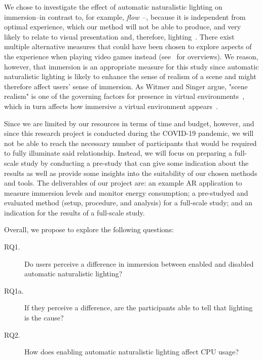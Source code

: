 \documentclass[12pt,twoside,english]{article}
\begin{document}
We chose to investigate the effect of automatic naturalistic lighting on immersion--in contrast to, for example, \textit{flow}~\cite{csikszentmihalyi_flow_1990}--, because it is independent from optimal experience, which our method will not be able to produce, and very likely to relate to visual presentation and, therefore, lighting~\cite{jennett_measuring_2008}.
There exist multiple alternative measures that could have been chosen to explore aspects of the experience when playing video games instead (see~\cite{dey_systematic_2018, dunser_survey_2008} for overviews).
We reason, however, that immersion is an appropriate measure for this study since automatic naturalistic lighting is likely to enhance the sense of realism of a scene and might therefore affect users' sense of immersion.
As Witmer and Singer argue, "scene realism" is one of the governing factors for presence in virtual environments~\cite{witmer_measuring_1998}, which in turn affects how immersive a virtual environment appears~\cite{jennett_measuring_2008}.

Since we are limited by our resources in terms of time and budget, however, and since this research project is conducted during the COVID-19 pandemic, we will not be able to reach the necessary number of participants that would be required to fully illuminate said relationship.
Instead, we will focus on preparing a full-scale study by conducting a pre-study that can give some indication about the results as well as provide some insights into the suitability of our chosen methods and tools.
The deliverables of our project are: an example \gls{AR} application to measure immersion levels and monitor energy consumption; a pre-studyed and evaluated method (setup, procedure, and analysis) for a full-scale study; and an indication for the results of a full-scale study.


Overall, we propose to explore the following questions:

\begin{description}
    \item[RQ1.] Do users perceive a difference in immersion between enabled and disabled automatic naturalistic lighting?
    \item[RQ1a.] If they perceive a difference, are the participants able to tell that lighting is the cause?
    \item[RQ2.] How does enabling automatic naturalistic lighting affect \gls{CPU} usage?
\end{description}
\end{document}
